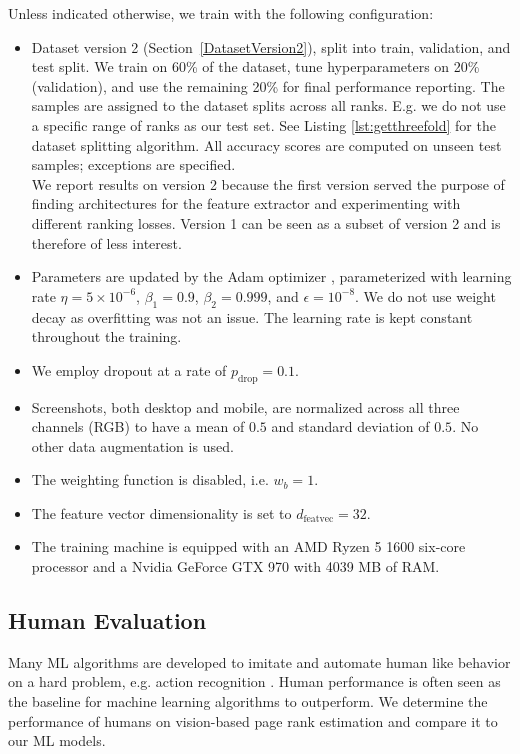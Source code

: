 Unless indicated otherwise, we train with the following configuration:
\begin{itemize}
    \item Dataset version 2 (Section~\ref{DatasetVersion2}), split into train, validation, and test split. We train on 60\% of the dataset, tune hyperparameters on 20\% (validation), and use the remaining 20\% for final performance reporting. The samples are assigned to the dataset splits across all ranks. E.g. we do not use a specific range of ranks as our test set. See Listing \ref{lst:getthreefold} for the dataset splitting algorithm. All accuracy scores are computed on unseen test samples; exceptions are specified.\\
    We report results on version 2 because the first version served the purpose of finding architectures for the feature extractor and experimenting with different ranking losses. Version 1 can be seen as a subset of version 2 and is therefore of less interest.
    \item Parameters are updated by the Adam optimizer \cite{kingma2014:adam}, parameterized with learning rate $\eta=5\times10^{-6}$, $\beta_1=0.9$, $\beta_2=0.999$, and $\epsilon=10^{-8}$. We do not use weight decay as overfitting was not an issue. The learning rate is kept constant throughout the training.
    \item We employ dropout \cite{srivastava2014:dropout} at a rate of $p_\text{drop}=0.1$.
    \item Screenshots, both desktop and mobile, are normalized across all three channels (RGB) to have a mean of $0.5$ and standard deviation of $0.5$. No other data augmentation is used.
    \item The weighting function is disabled, i.e. $w_b=1$.
    \item The feature vector dimensionality is set to $d_\text{featvec}=32$.
    \item The training machine is equipped with an AMD Ryzen 5 1600 six-core processor and a Nvidia GeForce GTX 970 with 4039 MB of RAM.
\end{itemize}

\subsection{Human Evaluation}

Many ML algorithms are developed to imitate and automate human like behavior on a hard problem, e.g. action recognition \cite{gu2018ava}. Human performance is often seen as the baseline for machine learning algorithms to outperform. We determine the performance of humans on vision-based page rank estimation and compare it to our ML models. 

